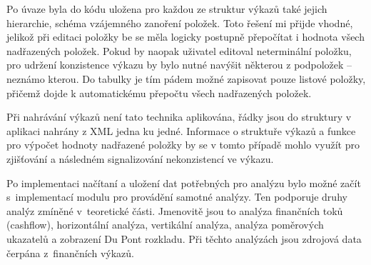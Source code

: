 Po úvaze byla do kódu uložena pro každou ze struktur výkazů také jejich hierarchie, schéma vzájemného zanoření položek. Toto řešení mi přijde vhodné, jelikož při editaci položky be se měla logicky postupně přepočítat i hodnota všech nadřazených položek. Pokud by naopak uživatel editoval neterminální položku, pro udržení konzistence výkazu by bylo nutné navýšit některou z podpoložek -- neznámo kterou. Do tabulky je tím pádem možné zapisovat pouze listové položky, přičemž dojde k automatickému přepočtu všech nadřazených položek.

Při nahrávání výkazů není tato technika aplikována, řádky jsou do struktury v aplikaci nahrány z XML jedna ku jedné. Informace o struktuře výkazů a funkce pro výpočet hodnoty nadřazené položky by se v tomto případě mohlo využít pro zjišťování a následném signalizování nekonzistencí ve výkazu.




Po implementaci načítaní a uložení dat potřebných pro analýzu bylo možné začít s~implementací modulu pro provádění samotné analýzy. Ten podporuje druhy analýz zmíněné v~teoretické části. Jmenovitě jsou to analýza finančních toků (cashflow), horizontální analýza, vertikální analýza, analýza poměrových ukazatelů a zobrazení Du Pont rozkladu. Při těchto analýzách jsou zdrojová data čerpána z~finančních výkazů. 

